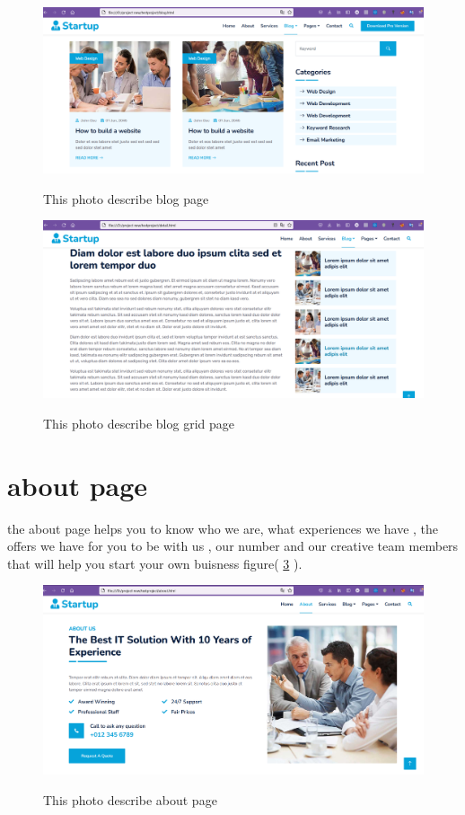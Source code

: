 \documentclass{article}
\begin{document}
\begin{figure}
\centering
\includegraphics[scale=.2]{images/blog.png}
\label{fig:blog}
\caption{This photo describe blog page }
\end{figure}

\begin{figure}
\centering
\includegraphics[scale=.2]{images/bloggrid.png}
\label{fig:bloggrid}
\caption{This photo describe blog grid page }
\end{figure}


\section{about page}
the about page helps you to know who we are, what experiences we have , the offers we have for you to be with us , our number and our creative team members that will help you start your own buisness figure( \ref{fig:about} ).

\begin{figure}
\centering
\includegraphics[scale=.2]{images/about.png}
\label{fig:about}
\caption{This photo describe about page}
\end{figure}
\end{document}
